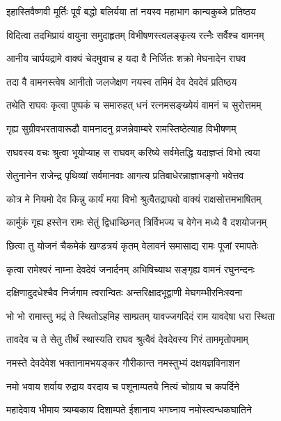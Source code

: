\twolineshloka
{इहास्तिवैष्णवी मूर्तिः पूर्वं बद्धो बलिर्यया}
{तां नयस्व महाभाग कान्यकुब्जे प्रतिष्ठय}%

\twolineshloka
{विदित्वा तदभिप्रायं वायुना समुदाहृतम्}
{विभीषणस्त्वलङ्कृत्य रत्नैः सर्वैश्च वामनम्}%

\twolineshloka
{आनीय चार्पयद्रामे वाक्यं चेदमुवाच ह}
{यदा वै निर्जितः शक्रो मेघनादेन राघव}%

\twolineshloka
{तदा वै वामनस्त्वेष आनीतो जलजेक्षण}
{नयस्व तमिमं देव देवदेवं प्रतिष्ठय}%

\twolineshloka
{तथेति राघवः कृत्वा पुष्पकं च समारुहत्}
{धनं रत्नमसङ्ख्येयं वामनं च सुरोत्तमम्}%

\twolineshloka
{गृह्य सुग्रीवभरतावारूढौ वामनादनु}
{व्रजन्नेवाम्बरे रामस्तिष्ठेत्याह विभीषणम्}%

\twolineshloka
{राघवस्य वचः श्रुत्वा भूयोप्याह स राघवम्}
{करिष्ये सर्वमेतद्धि यदाज्ञप्तं विभो त्वया}%

\twolineshloka
{सेतुनानेन राजेन्द्र पृथिव्यां सर्वमानवाः}
{आगत्य प्रतिबाधेरन्नाज्ञाभङ्गो भवेत्तव}%

\twolineshloka
{कोत्र मे नियमो देव किन्नु कार्यं मया विभो}
{श्रुत्वैतद्राघवो वाक्यं राक्षसोत्तमभाषितम्}%

\twolineshloka
{कार्मुकं गृह्य हस्तेन रामः सेतुं द्विधाच्छिनत्}
{त्रिर्विभज्य च वेगेन मध्ये वै दशयोजनम्}%

\twolineshloka
{छित्वा तु योजनं चैकमेकं खण्डत्रयं कृतम्}
{वेलावनं समासाद्य रामः पूजां रमापतेः}%

\twolineshloka
{कृत्वा रामेश्वरं नाम्ना देवदेवं जनार्दनम्}
{अभिषिच्याथ सङ्गृह्य वामनं रघुनन्दनः}%

\twolineshloka
{दक्षिणादुदधेश्चैव निर्जगाम त्वरान्वितः}
{अन्तरिक्षादभूद्वाणी मेघगम्भीरनिःस्वना}%


\twolineshloka
{भो भो रामास्तु भद्रं ते स्थितोऽहमिह साम्प्रतम्}
{यावज्जगदिदं राम यावदेषा धरा स्थिता}%

\twolineshloka
{तावदेव च ते सेतु तीर्थं स्थास्यति राघव}
{श्रुत्वैवं देवदेवस्य गिरं ताममृतोपमाम्}%


\twolineshloka
{नमस्ते देवदेवेश भक्तानामभयङ्कर}
{गौरीकान्त नमस्तुभ्यं दक्षयज्ञविनाशन}%

\twolineshloka
{नमो भवाय शर्वाय रुद्राय वरदाय च}
{पशूनाम्पतये नित्यं चोग्राय च कपर्दिने}%

\twolineshloka
{महादेवाय भीमाय त्र्यम्बकाय दिशाम्पते}
{ईशानाय भगघ्नाय नमोस्त्वन्धकघातिने}%

